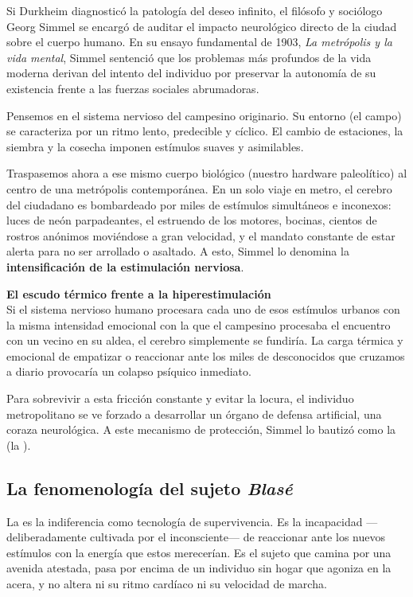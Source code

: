 Si Durkheim diagnosticó la patología del deseo infinito, el filósofo y sociólogo Georg Simmel se encargó de auditar el impacto neurológico directo de la ciudad sobre el cuerpo humano. En su ensayo fundamental de 1903, \textit{La metrópolis y la vida mental}, Simmel sentenció que los problemas más profundos de la vida moderna derivan del intento del individuo por preservar la autonomía de su existencia frente a las fuerzas sociales abrumadoras.

Pensemos en el sistema nervioso del campesino originario. Su entorno (el campo) se caracteriza por un ritmo lento, predecible y cíclico. El cambio de estaciones, la siembra y la cosecha imponen estímulos suaves y asimilables. 

Traspasemos ahora a ese mismo cuerpo biológico (nuestro hardware paleolítico) al centro de una metrópolis contemporánea. En un solo viaje en metro, el cerebro del ciudadano es bombardeado por miles de estímulos simultáneos e inconexos: luces de neón parpadeantes, el estruendo de los motores, bocinas, cientos de rostros anónimos moviéndose a gran velocidad, y el mandato constante de estar alerta para no ser arrollado o asaltado. A esto, Simmel lo denomina la \textbf{intensificación de la estimulación nerviosa}.

\begin{argumento}
\textbf{El escudo térmico frente a la hiperestimulación}\\
Si el sistema nervioso humano procesara cada uno de esos estímulos urbanos con la misma intensidad emocional con la que el campesino procesaba el encuentro con un vecino en su aldea, el cerebro simplemente se fundiría. La carga térmica y emocional de empatizar o reaccionar ante los miles de desconocidos que cruzamos a diario provocaría un colapso psíquico inmediato.

Para sobrevivir a esta fricción constante y evitar la locura, el individuo metropolitano se ve forzado a desarrollar un órgano de defensa artificial, una coraza neurológica. A este mecanismo de protección, Simmel lo bautizó como la \textbf{\Blasiertheit} (la \textbf{\ActitudBlase}).
\end{argumento}

\subsection{La fenomenología del sujeto \textit{Blasé}}

La \ActitudBlase{} es la indiferencia como tecnología de supervivencia. Es la incapacidad —deliberadamente cultivada por el inconsciente— de reaccionar ante los nuevos estímulos con la energía que estos merecerían. Es el sujeto que camina por una avenida atestada, pasa por encima de un individuo sin hogar que agoniza en la acera, y no altera ni su ritmo cardíaco ni su velocidad de marcha. 

